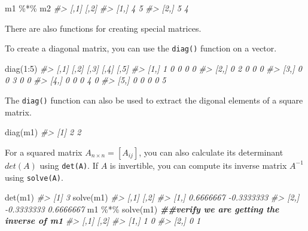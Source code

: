 \documentclass[
]{book}
\newenvironment{Shaded}{\begin{snugshade}}{\end{snugshade}}
\newcommand{\CommentTok}[1]{\textcolor[rgb]{0.56,0.35,0.01}{\textit{#1}}}
\newcommand{\DecValTok}[1]{\textcolor[rgb]{0.00,0.00,0.81}{#1}}
\newcommand{\DocumentationTok}[1]{\textcolor[rgb]{0.56,0.35,0.01}{\textbf{\textit{#1}}}}
\newcommand{\FunctionTok}[1]{\textcolor[rgb]{0.00,0.00,0.00}{#1}}
\newcommand{\NormalTok}[1]{#1}
\newcommand{\SpecialCharTok}[1]{\textcolor[rgb]{0.00,0.00,0.00}{#1}}
\begin{document}
\begin{Shaded}
\begin{Highlighting}[]
\NormalTok{m1 }\SpecialCharTok{\%*\%}\NormalTok{ m2}
\CommentTok{\#\textgreater{}      [,1] [,2]}
\CommentTok{\#\textgreater{} [1,]    4    5}
\CommentTok{\#\textgreater{} [2,]    5    4}
\end{Highlighting}
\end{Shaded}

There are also functions for creating special matrices.

To create a diagonal matrix, you can use the \texttt{diag()} function on a vector.

\begin{Shaded}
\begin{Highlighting}[]
\FunctionTok{diag}\NormalTok{(}\DecValTok{1}\SpecialCharTok{:}\DecValTok{5}\NormalTok{)}
\CommentTok{\#\textgreater{}      [,1] [,2] [,3] [,4] [,5]}
\CommentTok{\#\textgreater{} [1,]    1    0    0    0    0}
\CommentTok{\#\textgreater{} [2,]    0    2    0    0    0}
\CommentTok{\#\textgreater{} [3,]    0    0    3    0    0}
\CommentTok{\#\textgreater{} [4,]    0    0    0    4    0}
\CommentTok{\#\textgreater{} [5,]    0    0    0    0    5}
\end{Highlighting}
\end{Shaded}

The \texttt{diag()} function can also be used to extract the digonal elements of a square matrix.

\begin{Shaded}
\begin{Highlighting}[]
\FunctionTok{diag}\NormalTok{(m1)}
\CommentTok{\#\textgreater{} [1] 2 2}
\end{Highlighting}
\end{Shaded}

For a squared matrix \(A_{n\times n} = [A_{ij}]\), you can also calculate its determinant \(det(A)\) using \texttt{det(A)}. If \(A\) is invertible, you can compute its inverse matrix \(A^{-1}\) using \texttt{solve(A)}.

\begin{Shaded}
\begin{Highlighting}[]
\FunctionTok{det}\NormalTok{(m1)}
\CommentTok{\#\textgreater{} [1] 3}
\FunctionTok{solve}\NormalTok{(m1)}
\CommentTok{\#\textgreater{}            [,1]       [,2]}
\CommentTok{\#\textgreater{} [1,]  0.6666667 {-}0.3333333}
\CommentTok{\#\textgreater{} [2,] {-}0.3333333  0.6666667}
\NormalTok{m1 }\SpecialCharTok{\%*\%} \FunctionTok{solve}\NormalTok{(m1)   }\DocumentationTok{\#\#verify we are getting the inverse of m1}
\CommentTok{\#\textgreater{}      [,1] [,2]}
\CommentTok{\#\textgreater{} [1,]    1    0}
\CommentTok{\#\textgreater{} [2,]    0    1}
\end{Highlighting}
\end{Shaded}
\end{document}
